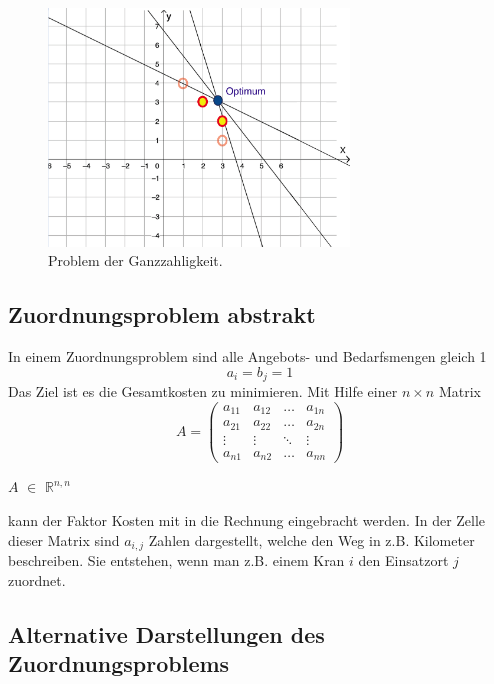 \begin{figure}
\centering
\includegraphics[width=8cm]{papers/munkres/figures/ganzzahlige_punkte}
\caption{Problem der Ganzzahligkeit.}
\label{munkres:Vr2}
\end{figure}


\subsection{Zuordnungsproblem abstrakt
\label{munkres:subsection:bonorum}}

In einem Zuordnungsproblem sind alle Angebots- und Bedarfsmengen gleich 1 
\begin{equation}
a_{i}=b_{j}=1
\end{equation}
Das Ziel ist es die Gesamtkosten zu minimieren. Mit Hilfe einer $n\times n$ Matrix 
\[
A
=
\begin{pmatrix}
a_{11}&a_{12}&\dots &a_{1n}\\
a_{21}&a_{22}&\dots &a_{2n}\\
\vdots&\vdots&\ddots&\vdots\\
a_{n1}&a_{n2}&\dots &a_{nn}
\end{pmatrix}
\]

$A$ $\mathbb{\in}$ $\mathbb{R}^{n,n}$

kann der Faktor Kosten mit in die Rechnung eingebracht werden.
In der Zelle dieser Matrix sind $a_{i,j}$ Zahlen dargestellt, welche den Weg in z.B. Kilometer beschreiben.
Sie entstehen, wenn man z.B. einem Kran $i$ den Einsatzort $j$ zuordnet.

\subsection{Alternative Darstellungen des Zuordnungsproblems
\label{munkres:subsection:bonorum}}
